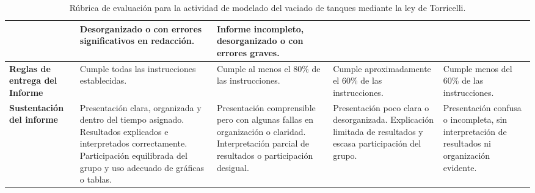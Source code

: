 \documentclass[oneside,letter,spanish,activeacute,english,links,10pt]{amcaGCS_EDO}
\begin{document}
\begin{table}[h!]
\begin{tabular}{|p{2.0cm}|p{3.3cm}|p{2.8cm}|p{2.8cm}|p{2.8cm}|}
		& Desorganizado o con errores significativos en redacción.
		& Informe incompleto, desorganizado o con errores graves. \\
		\hline
		\textbf{Reglas de entrega del Informe}
		& Cumple todas las instrucciones establecidas.
		& Cumple al menos el 80\% de las instrucciones.
		& Cumple aproximadamente el 60\% de las instrucciones.
		& Cumple menos del 60\% de las instrucciones. \\
		\hline
		\textbf{Sustentación del informe}
		& Presentación clara, organizada y dentro del tiempo asignado. Resultados explicados e interpretados correctamente. Participación equilibrada del grupo y uso adecuado de gráficas o tablas.
		& Presentación comprensible pero con algunas fallas en organización o claridad. Interpretación parcial de resultados o participación desigual.
		& Presentación poco clara o desorganizada. Explicación limitada de resultados y escasa participación del grupo.
		& Presentación confusa o incompleta, sin interpretación de resultados ni organización evidente. \\
		\hline
	\end{tabular}
	\caption{Rúbrica de evaluación para la actividad de modelado del vaciado de tanques mediante la ley de Torricelli.}
	\label{tab:rubrica}
\end{table}
\end{document}
